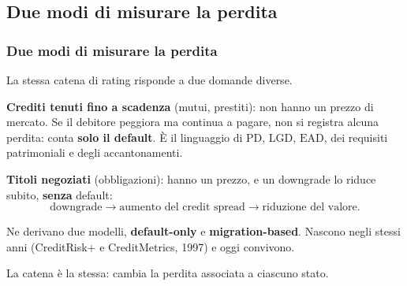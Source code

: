 

\subsection{Due modi di misurare la perdita}%

\begin{frame}%
%

\frametitle{Due modi di misurare la perdita}%
%

%


La stessa catena di rating risponde a due domande diverse.

\medskip

\begin{stepitemize}
\item \textbf{Crediti tenuti fino a scadenza} (mutui, prestiti): non hanno un
prezzo di mercato. Se il debitore peggiora ma continua a pagare, non si
registra alcuna perdita: conta \textbf{solo il default}. \`E il linguaggio di
$\mathrm{PD}$, $\mathrm{LGD}$, $\mathrm{EAD}$, dei requisiti patrimoniali e
degli accantonamenti.

\item \textbf{Titoli negoziati} (obbligazioni): hanno un prezzo, e un
downgrade lo riduce subito, \textbf{senza} default:
\[
\text{downgrade} \longrightarrow\text{aumento del credit spread}
\longrightarrow\text{riduzione del valore}.
\]

\item Ne derivano due modelli, \textbf{default-only} e
\textbf{migration-based}. Nascono negli stessi anni (CreditRisk+ e
CreditMetrics, 1997) e oggi convivono.
\end{stepitemize}

\medskip

\begin{center}
{\small La catena \`e la stessa: cambia la perdita associata a ciascuno
stato.}
\end{center}

\transboxout
\end{frame}%


